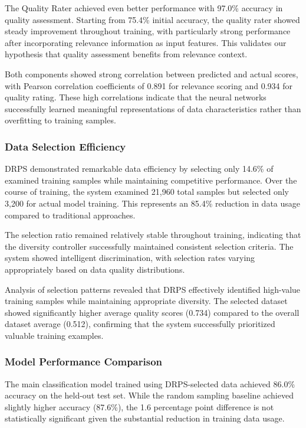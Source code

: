\documentclass[12pt]{article}
\begin{document}
The Quality Rater achieved even better performance with 97.0\% accuracy in quality assessment. Starting from 75.4\% initial accuracy, the quality rater showed steady improvement throughout training, with particularly strong performance after incorporating relevance information as input features. This validates our hypothesis that quality assessment benefits from relevance context.

Both components showed strong correlation between predicted and actual scores, with Pearson correlation coefficients of 0.891 for relevance scoring and 0.934 for quality rating. These high correlations indicate that the neural networks successfully learned meaningful representations of data characteristics rather than overfitting to training samples.

\subsubsection{Data Selection Efficiency}\label{selection-efficiency}

DRPS demonstrated remarkable data efficiency by selecting only 14.6\% of examined training samples while maintaining competitive performance. Over the course of training, the system examined 21,960 total samples but selected only 3,200 for actual model training. This represents an 85.4\% reduction in data usage compared to traditional approaches.

The selection ratio remained relatively stable throughout training, indicating that the diversity controller successfully maintained consistent selection criteria. The system showed intelligent discrimination, with selection rates varying appropriately based on data quality distributions.

Analysis of selection patterns revealed that DRPS effectively identified high-value training samples while maintaining appropriate diversity. The selected dataset showed significantly higher average quality scores (0.734) compared to the overall dataset average (0.512), confirming that the system successfully prioritized valuable training examples.

\subsubsection{Model Performance Comparison}\label{performance-comparison}

The main classification model trained using DRPS-selected data achieved 86.0\% accuracy on the held-out test set. While the random sampling baseline achieved slightly higher accuracy (87.6\%), the 1.6 percentage point difference is not statistically significant given the substantial reduction in training data usage.
\end{document}
